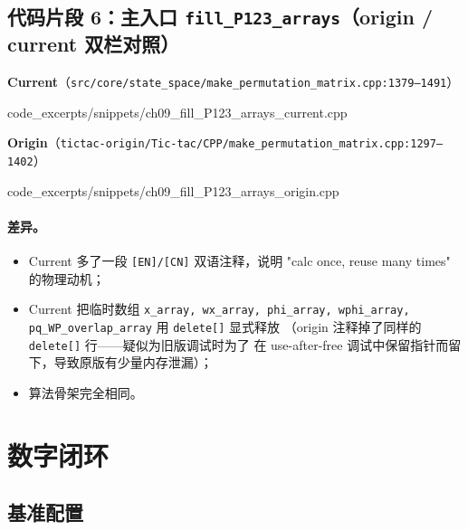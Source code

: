 \subsection{代码片段 6：主入口 \texttt{fill\_P123\_arrays}（origin / current 双栏对照）}
\label{subsec:ch09-code-fill-entry}

\noindent\textbf{Current}（\texttt{src/core/state\_space/make\_permutation\_matrix.cpp:1379--1491}）


{code_excerpts/snippets/ch09_fill_P123_arrays_current.cpp}

\noindent\textbf{Origin}（\texttt{tictac-origin/Tic-tac/CPP/make\_permutation\_matrix.cpp:1297--1402}）


{code_excerpts/snippets/ch09_fill_P123_arrays_origin.cpp}

\paragraph{差异。}
\begin{itemize}
\item Current 多了一段 \texttt{[EN]/[CN]} 双语注释，说明
      "calc once, reuse many times" 的物理动机；
\item Current 把临时数组 \texttt{x\_array, wx\_array, phi\_array,
      wphi\_array, pq\_WP\_overlap\_array} 用 \texttt{delete[]} 显式释放
      （origin 注释掉了同样的 \texttt{delete[]} 行——疑似为旧版调试时为了
      在 use-after-free 调试中保留指针而留下，导致原版有少量内存泄漏）；
\item 算法骨架完全相同。
\end{itemize}

\section{数字闭环}
\label{sec:ch09-numerical-snapshot}

\subsection{基准配置}
\label{subsec:ch09-benchmark-config}

